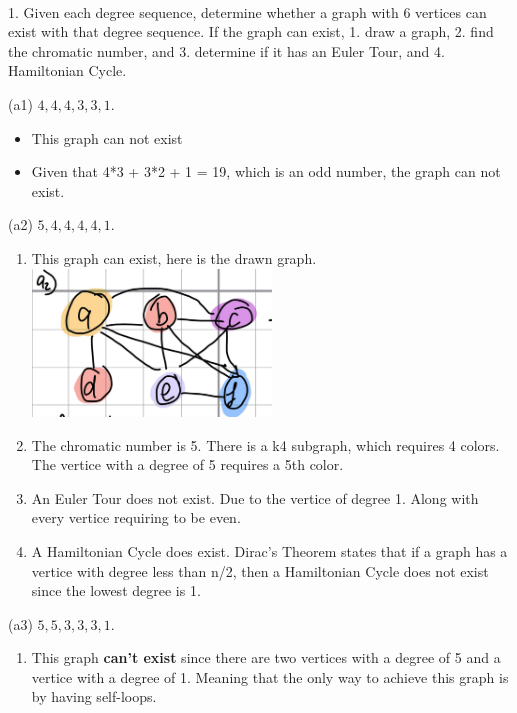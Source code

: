 \documentclass[11pt]{article}
\newcounter{prnum}
\newenvironment{problem}{{\vskip 0.2in\noindent\bf Problem
       \addtocounter{prnum}{1} \arabic{prnum}.}}{\vskip 0.1in}
\begin{document}
\pagebreak



\begin{problem}\\
  1. Given each degree sequence, determine whether a graph with 6 vertices can exist with that degree sequence.
  If the graph can exist, 1. draw a graph, 2. find the chromatic number, and 3. determine if it has an Euler Tour, and 4. Hamiltonian Cycle.
\begin{description}\setlength{\itemsep}{-3pt}
  \item{(a1)} $4, 4, 4, 3, 3, 1$.
    \begin{itemize}
      \item This graph can not exist
      \item Given that 4*3 + 3*2 + 1 = 19, which is an odd number, the graph can not exist.
    \end{itemize}
	\item{(a2)} $5, 4, 4, 4, 4, 1$.
    \begin{enumerate}
      \item This graph can exist, here is the drawn graph.\\
          \includegraphics[width=0.5\textwidth]{GraphA2.jpg}
      \item The chromatic number is 5. There is a k4 subgraph, which requires 4 colors. 
        The vertice with a degree of 5 requires a 5th color.
      \item An Euler Tour does not exist. Due to the vertice of degree 1. Along with every vertice requiring to be even.
      \item A Hamiltonian Cycle does exist. 
        Dirac's Theorem states that if a graph has a vertice with degree less than n/2, 
        then a Hamiltonian Cycle does not exist since the lowest degree is 1.
    \end{enumerate}
	\item{(a3)} $5, 5, 3, 3, 3, 1$.
    \begin{enumerate}
      \item This graph \textbf{can't exist} since there are two vertices with a degree of 5 and a vertice with a degree of 1.
        Meaning that the only way to achieve this graph is by having self-loops.
    \end{enumerate}


\end{description}
\end{problem}
\end{document}
